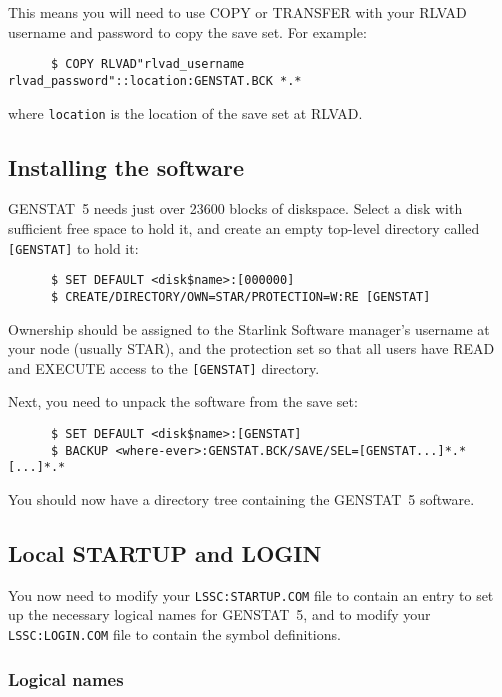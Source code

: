 This means you will need to use COPY or TRANSFER with your RLVAD username
and password to copy the save set. For example:
\begin{verbatim}
      $ COPY RLVAD"rlvad_username rlvad_password"::location:GENSTAT.BCK *.*
\end{verbatim}
where {\tt location} is the location of the save set at RLVAD.

\subsection{Installing the software}

GENSTAT~5 needs just over 23600 blocks of diskspace. Select a disk with
sufficient free space to hold it, and create an empty top-level
directory called {\tt [GENSTAT]} to hold it:
\begin{verbatim}
      $ SET DEFAULT <disk$name>:[000000]
      $ CREATE/DIRECTORY/OWN=STAR/PROTECTION=W:RE [GENSTAT]
\end{verbatim}
Ownership should be assigned to the Starlink Software manager's username at 
your node (usually STAR), and the protection set so that all users have READ 
and EXECUTE access to the {\tt [GENSTAT]} directory.

Next, you need to unpack the software from the save set:
\begin{verbatim}
      $	SET DEFAULT <disk$name>:[GENSTAT]
      $ BACKUP <where-ever>:GENSTAT.BCK/SAVE/SEL=[GENSTAT...]*.* [...]*.*
\end{verbatim}

You should now have a directory tree containing the GENSTAT~5 software.

\subsection{Local STARTUP and LOGIN}

You now need to modify your {\tt LSSC:STARTUP.COM} file to contain an entry to
set up  the necessary logical names for GENSTAT~5, and to modify your {\tt
LSSC:LOGIN.COM} file to contain the symbol definitions.

\subsubsection{Logical names}


